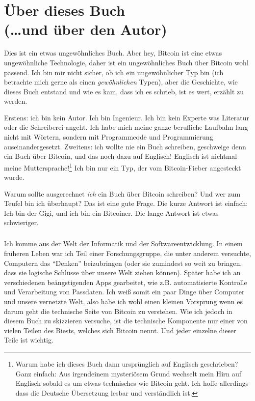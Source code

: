 
\def\bitcoinB{\leavevmode
  {\setbox0=\hbox{\textsf{B}}%
    \dimen0\ht0 \advance\dimen0 0.2ex
    \ooalign{\hfil \box0\hfil\cr
      \hfil\vrule height \dimen0 depth.2ex\hfil\cr
    }%
  }%
}

\chapter*{Über dieses Buch \\ (\ldots und über den Autor)}

Dies ist ein etwas ungewöhnliches Buch. Aber hey, Bitcoin ist eine etwas
ungewöhnliche Technologie, daher ist ein ungewöhnliches Buch über Bitcoin wohl
passend. Ich bin mir nicht sicher, ob ich ein ungewöhnlicher Typ bin (ich
betrachte mich gerne als einen \textit{gewöhnlichen} Typen), aber die
Geschichte, wie dieses Buch entstand und wie es kam, dass ich es schrieb, ist es
wert, erzählt zu werden.

Erstens: ich bin kein Autor. Ich bin Ingenieur. Ich bin kein Experte was
Literatur oder die Schreiberei angeht. Ich habe mich meine ganze berufliche
Laufbahn lang nicht mit Wörtern, sondern mit Programmcode und Programmierung
auseinandergesetzt. Zweitens: ich wollte nie ein Buch schreiben, geschweige denn
ein Buch über Bitcoin, und das noch dazu auf Englisch! Englisch ist nichtmal
meine Muttersprache!\footnote{Warum habe ich dieses Buch dann ursprünglich auf
Englisch geschrieben? Ganz einfach: Aus irgendeinem mysteriösem Grund wechselt
mein Hirn auf Englisch sobald es um etwas technisches wie Bitcoin geht. Ich
hoffe allerdings dass die Deutsche Übersetzung lesbar und verständlich ist.} Ich
bin nur ein Typ, der vom Bitcoin-Fieber angesteckt wurde.

Warum sollte ausgerechnet \textit{ich} ein Buch über Bitcoin schreiben? Und wer
zum Teufel bin ich überhaupt? Das ist eine gute Frage. Die kurze Antwort ist
einfach: Ich bin der Gigi, und ich bin ein Bitcoiner. Die lange Antwort ist
etwas schwieriger.

\paragraph{}
Ich komme aus der Welt der Informatik und der Softwareentwicklung. In einem
früheren Leben war ich Teil einer Forschungsgruppe, die unter anderem versuchte,
Computern das \enquote{Denken} beizubringen (oder sie zumindest so weit zu
bringen, dass sie logische Schlüsse über unsere Welt ziehen können). Später habe
ich an verschiedenen beängstigenden Apps gearbeitet, wie z.B. automatisierte
Kontrolle und Verarbeitung von Passdaten. Ich weiß somit ein paar Dinge über
Computer und unsere vernetzte Welt, also habe ich wohl einen kleinen Vorsprung
wenn es darum geht die technische Seite von Bitcoin zu verstehen. Wie ich jedoch
in diesem Buch zu skizzieren versuche, ist die technische Komponente nur einer
von vielen  Teilen des Biests, welches sich Bitcoin nennt. Und jeder einzelne
dieser Teile ist wichtig.

